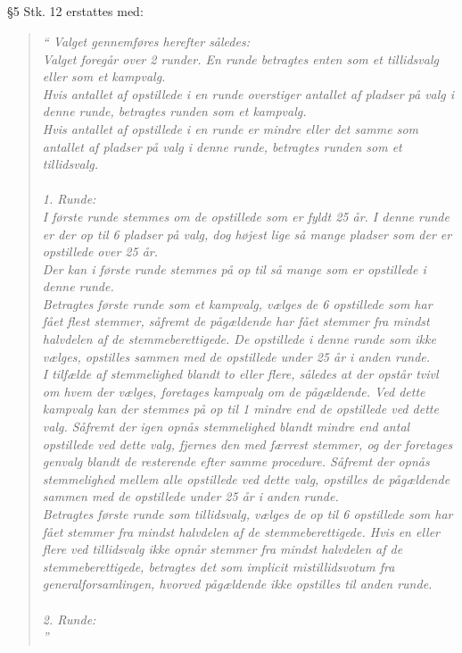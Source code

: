 \documentclass[a4paper,12pt,danish]{article}
\newcommand\cit[1]{
    \begin{quote}
        \textit{``#1''}
    \end{quote}
}
\newcommand\alt[1]{
    \subsection{}
    #1
}
\begin{document}
{    \alt{
        \S5 Stk. 12 erstattes med:
        \cit{
            Valget gennemføres herefter således:\\
            Valget foregår over 2 runder. En runde betragtes enten som et tillidsvalg eller som et kampvalg.\\
            Hvis antallet af opstillede i en runde overstiger antallet af pladser på valg i denne runde, betragtes runden som et kampvalg.\\
            Hvis antallet af opstillede i en runde er mindre eller det samme som antallet af pladser på valg i denne runde, betragtes runden som et tillidsvalg.\\
            \\
            1. Runde:\\
            I første runde stemmes om de opstillede som er fyldt 25 år. I denne runde er der op til 6 pladser på valg, dog højest lige så mange pladser som der er opstillede over 25 år.\\
            Der kan i første runde stemmes på op til så mange som er opstillede i denne runde.\\
            Betragtes første runde som et kampvalg, vælges de 6 opstillede som har fået flest stemmer, såfremt de pågældende har fået stemmer fra mindst halvdelen af de stemmeberettigede. De opstillede i denne runde som ikke vælges, opstilles sammen med de opstillede under 25 år i anden runde.\\
            I tilfælde af stemmelighed blandt to eller flere, således at der opstår tvivl om hvem der vælges, foretages kampvalg om de pågældende. Ved dette kampvalg kan der stemmes på op til 1 mindre end de opstillede ved dette valg. Såfremt der igen opnås stemmelighed blandt mindre end antal opstillede ved dette valg, fjernes den med færrest stemmer, og der foretages genvalg blandt de resterende efter samme procedure. Såfremt der opnås stemmelighed mellem alle opstillede ved dette valg, opstilles de pågældende sammen med de opstillede under 25 år i anden runde.\\
            Betragtes første runde som tillidsvalg, vælges de op til 6 opstillede som har fået stemmer fra mindst halvdelen af de stemmeberettigede. Hvis en eller flere ved tillidsvalg ikke opnår stemmer fra mindst halvdelen af de stemmeberettigede, betragtes det som implicit mistillidsvotum fra generalforsamlingen, hvorved pågældende ikke opstilles til anden runde.\\
            \\
            2. Runde:\\
}}}
\end{document}
